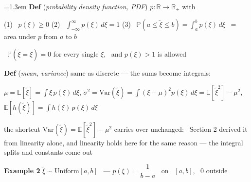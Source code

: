 \documentclass[10pt]{article}
\newenvironment{board}{%
  \par\vspace{4pt}
  \begingroup\leftskip=1.3em\relax\parskip=2pt\relax}{%
  \par\endgroup\vspace{4pt}}
\begin{document}
\begin{board}
\textbf{Def} (\emph{probability density function, PDF}) \quad $p : \mathbb{R} \to \mathbb{R}_+$ with
\vspace{3pt}

\quad (1) \ $p(\xi) \ge 0$ \qquad (2) \ $\int_{-\infty}^{\infty} p(\xi)\, d\xi = 1$ \qquad
(3) \ $\mathbb{P}(a \le \tilde\xi \le b) = \int_a^b p(\xi)\, d\xi$ \ = area under $p$ from $a$ to $b$
\vspace{3pt}

 \ $\mathbb{P}(\tilde\xi = \xi) = 0$ for every single $\xi$, \ and $p(\xi) > 1$ is allowed
\vspace{8pt}

\textbf{Def} (\emph{mean, variance}) \quad same as discrete --- the sums become integrals:
\vspace{3pt}

\quad $\mu = \mathbb{E}[\tilde\xi] = \int \xi\, p(\xi)\, d\xi$, \qquad
$\sigma^2 = \mathrm{Var}(\tilde\xi) = \int (\xi - \mu)^2 p(\xi)\, d\xi = \mathbb{E}[\tilde\xi^2] - \mu^2$, \qquad
$\mathbb{E}[h(\tilde\xi)] = \int h(\xi)\, p(\xi)\, d\xi$
\vspace{3pt}

\quad the shortcut $\mathrm{Var}(\tilde\xi) = \mathbb{E}[\tilde\xi^2] - \mu^2$ carries over unchanged: \ Section 2 derived it
      from linearity alone, and linearity holds here for the same reason --- the integral splits and constants come out
\vspace{10pt}

\textbf{Example 2} \quad $\tilde\xi \sim \mathrm{Uniform}[a,b]$ \ ---
$p(\xi) = \dfrac{1}{b-a}$ \ on \ $[a,b]$, \ $0$ outside
\vspace{4pt}

\begin{center}
\end{center}
\vspace{4pt}


\end{board}
\end{document}
